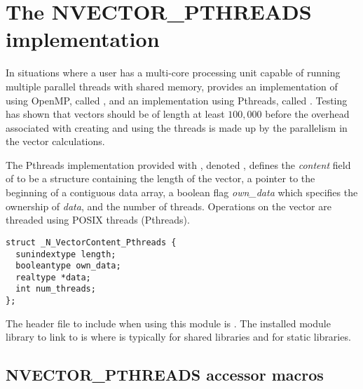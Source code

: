 \section{The NVECTOR\_PTHREADS implementation}\label{ss:nvec_pthreads}

In situations where a user has a multi-core processing unit capable of
running multiple parallel threads with shared memory, {\sundials} provides
an implementation of {\nvector} using OpenMP, called {\nvecopenmp}, and
an implementation using Pthreads, called {\nvecpthreads}.  
Testing has shown that vectors should be of length at least $100,000$ 
before the overhead associated with creating and using the threads is
made up by the parallelism in the vector calculations. 

The Pthreads {\nvector} implementation provided with {\sundials}, denoted
{\nvecpthreads}, defines the {\em content} field of  to be a structure 
containing the length of the vector, a pointer to the beginning of a contiguous 
data array, a boolean flag {\em own\_data} which specifies the ownership 
of {\em data}, and the number of threads.  
Operations on the vector are threaded using POSIX threads 
(Pthreads).
\begin{verbatim} 
struct _N_VectorContent_Pthreads {
  sunindextype length;
  booleantype own_data;
  realtype *data;
  int num_threads;
};
\end{verbatim}

The header file to include when using this module is .
The installed module library to link to is
where  is typically  for shared libraries and 
for static libraries.

\subsection{NVECTOR\_PTHREADS accessor macros}
\label{ss:nvec_pthreads_macros}

